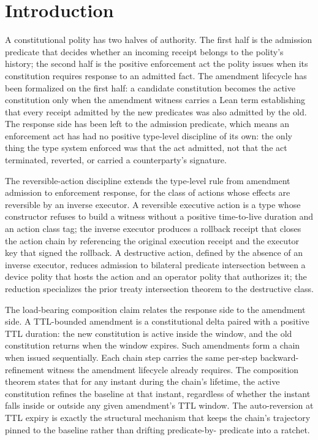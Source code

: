 \section{Introduction}

A constitutional polity has two halves of authority. The first half is
the admission predicate that decides whether an incoming receipt belongs
to the polity's history; the second half is the positive enforcement act
the polity issues when its constitution requires response to an admitted
fact. The amendment lifecycle has been formalized on the first half: a
candidate constitution becomes the active constitution only when the
amendment witness carries a Lean term establishing that every receipt
admitted by the new predicates was also admitted by the old. The
response side has been left to the admission predicate, which means an
enforcement act has had no positive type-level discipline of its own:
the only thing the type system enforced was that the act admitted, not
that the act terminated, reverted, or carried a counterparty's signature.

The reversible-action discipline extends the type-level rule from
amendment admission to enforcement response, for the class of actions
whose effects are reversible by an inverse executor. A reversible
executive action is a type whose constructor refuses to build a witness
without a positive time-to-live duration and an action class tag; the
inverse executor produces a rollback receipt that closes the action
chain by referencing the original execution receipt and the executor key
that signed the rollback. A destructive action, defined by the absence
of an inverse executor, reduces admission to bilateral predicate
intersection between a device polity that hosts the action and an
operator polity that authorizes it; the reduction specializes the prior
treaty intersection theorem \cite{programmableSovereigntyAnonymous} to
the destructive class.

The load-bearing composition claim relates the response side to the
amendment side. A TTL-bounded amendment is a constitutional delta paired
with a positive TTL duration: the new constitution is active inside the
window, and the old constitution returns when the window expires. Such
amendments form a chain when issued sequentially. Each chain step
carries the same per-step backward-refinement witness the amendment
lifecycle already requires. The composition theorem states that for any
instant during the chain's lifetime, the active constitution refines the
baseline at that instant, regardless of whether the instant falls inside
or outside any given amendment's TTL window. The auto-reversion at TTL
expiry is exactly the structural mechanism that keeps the chain's
trajectory pinned to the baseline rather than drifting predicate-by-
predicate into a ratchet.

